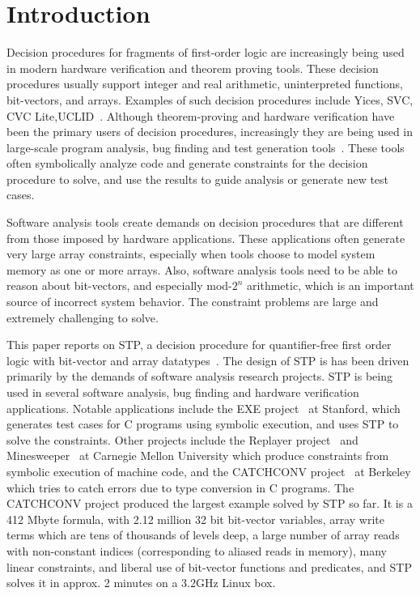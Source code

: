 \section{Introduction}

Decision procedures for fragments of first-order logic are
increasingly being used in modern hardware verification and theorem
proving tools. These decision procedures usually support integer and
real arithmetic, uninterpreted functions, bit-vectors, and
arrays. Examples of such decision procedures include Yices, SVC, CVC
Lite,UCLID~\cite{yices,svc,cvcl,uclid}. Although theorem-proving and
hardware verification have been the primary users of decision
procedures, increasingly they are being used in large-scale program
analysis, bug finding and test generation
tools~\cite{exe-ccs06,replayer06}. These tools often symbolically
analyze code and generate constraints for the decision procedure to
solve, and use the results to guide analysis or generate
new test cases.

Software analysis tools create demands on decision procedures that are
different from those imposed by hardware applications. These
applications often generate very large array constraints, especially
when tools choose to model system memory as one or more arrays.  Also,
software analysis tools need to be able to reason about bit-vectors,
and especially mod-$2^n$ arithmetic, which is an important source of
incorrect system behavior.  The constraint problems are large and
extremely challenging to solve.

This paper reports on STP, a decision procedure for quantifier-free
first order logic with bit-vector and array
datatypes~\cite{stumparray}.  The design of STP is has been driven
primarily by the demands of software analysis research projects. STP
is being used in several software analysis, bug finding and hardware
verification applications. Notable applications include the EXE
project~\cite{exe-ccs06} at Stanford, which generates test cases for C
programs using symbolic execution, and uses STP to solve the
constraints. Other projects include the Replayer
project~\cite{replayer06} and Minesweeper~\cite{minesweeper2007} at
Carnegie Mellon University which produce constraints from symbolic
execution of machine code, and the CATCHCONV
project~\cite{catchconv07} at Berkeley which tries to catch errors due
to type conversion in C programs. The CATCHCONV project produced the
largest example solved by STP so far. It is a 412 Mbyte formula, with
2.12 million 32 bit bit-vector variables, array write terms which are
tens of thousands of levels deep, a large number of array reads with
non-constant indices (corresponding to aliased reads in memory), many
linear constraints, and liberal use of bit-vector functions and
predicates, and STP solves it in approx. 2 minutes on a 3.2GHz Linux
box.

